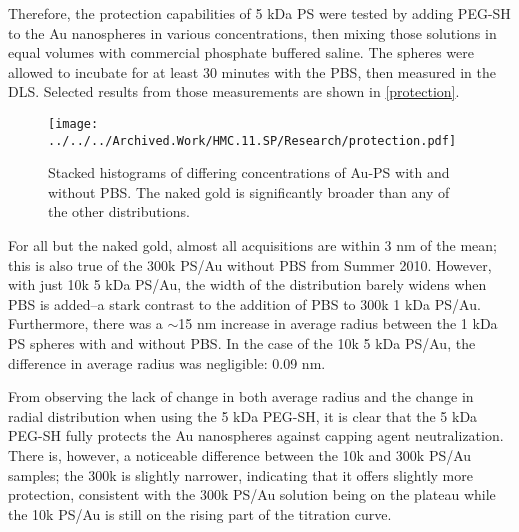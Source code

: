 Therefore, the protection capabilities of 5 kDa PS were tested by adding PEG-SH to the Au nanospheres in various concentrations, then mixing those solutions in equal volumes with commercial phosphate buffered saline. The spheres were allowed to incubate for at least 30 minutes with the PBS, then measured in the DLS. Selected results from those measurements are shown in \autoref{protection}.

\begin{figure}[htbp]
\centering
\texttt{[image: ../../../Archived.Work/HMC.11.SP/Research/protection.pdf]}
\caption{Stacked histograms of differing concentrations of Au-PS with and without PBS. The naked gold is significantly broader than any of the other distributions.}
\label{protection}
\end{figure}



For all but the naked gold, almost all acquisitions are within 3 nm of the mean; this is also true of the 300k PS\slash Au without PBS from Summer 2010. However, with just 10k 5 kDa PS\slash Au, the width of the distribution barely widens when PBS is added--a stark contrast to the addition of PBS to 300k 1 kDa PS\slash Au. Furthermore, there was a \ensuremath{\sim}15 nm increase in average radius between the 1 kDa PS spheres with and without PBS. In the case of the 10k 5 kDa PS\slash Au, the difference in average radius was negligible: 0.09 nm.

From observing the lack of change in both average radius and the change in radial distribution when using the 5 kDa PEG-SH, it is clear that the 5 kDa PEG-SH fully protects the Au nanospheres against capping agent neutralization. There is, however, a noticeable difference between the 10k and 300k PS\slash Au samples; the 300k is slightly narrower, indicating that it offers slightly more protection, consistent with the 300k PS\slash Au solution being on the plateau while the 10k PS\slash Au is still on the rising part of the titration curve.
